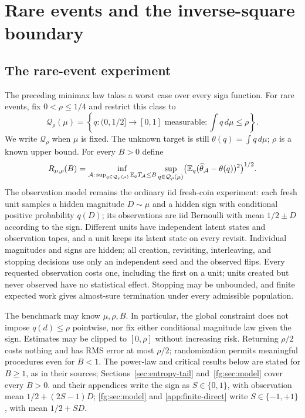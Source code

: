 \section{Rare events and the inverse-square boundary}\label{sec:rare}
\subsection{The rare-event experiment}\label{sec:rare-model}
The preceding minimax law takes a worst case over every sign function.
For rare events, fix $0<\rho\le1/4$ and restrict this class to
\[
 \mathcal Q_\rho(\mu)=
 \left\{q:(0,1/2]\to[0,1]\text{ measurable}:\int q\,d\mu\le\rho\right\}.
\]
We write $\mathcal Q_\rho$ when $\mu$ is fixed.
The unknown target is still $\theta(q)=\int q\,d\mu$; $\rho$ is a known
upper bound. For every $B>0$ define
\[
 R_{\mu,\rho}(B)=
 \inf_{\mathcal A:\,\sup_{q\in\mathcal Q_\rho(\mu)}\mathbb E_qT_\mathcal A\le B}
 \sup_{q\in\mathcal Q_\rho(\mu)}
       \bigl(\mathbb E_q(\widehat\theta_\mathcal A-\theta(q))^2\bigr)^{1/2}.
\]
The observation model remains the ordinary iid fresh-coin experiment:
each fresh unit samples a hidden magnitude $D\sim\mu$ and a hidden sign
with conditional positive probability $q(D)$; its observations are iid
Bernoulli with mean $1/2\pm D$ according to the sign. Different units
have independent latent states and observation tapes, and a unit keeps
its latent state on every revisit. Individual magnitudes and signs are
hidden; all creation, revisiting, interleaving, and stopping decisions
use only an independent seed and the observed flips. Every requested
observation costs one, including the first on a unit; units created but
never observed have no statistical effect. Stopping may be unbounded,
and finite expected work gives almost-sure termination under every
admissible population.

The benchmark may know $\mu,\rho,B$. In particular, the global constraint
does not impose $q(d)\le\rho$ pointwise, nor fix either conditional
magnitude law given the sign. Estimates may be clipped to $[0,\rho]$
without increasing risk. Returning $\rho/2$ costs nothing and has
RMS error at most $\rho/2$; randomization permits meaningful procedures
even for $B<1$. The power-law and critical results below are stated for
$B\ge1$, as in their sources; Sections~\ref{sec:entropy-tail}
and~\ref{fg:sec:model} cover every $B>0$.
 and their appendices write the
sign as $S\in\{0,1\}$, with observation mean $1/2+(2S-1)D$;
\cref{fg:sec:model} and \cref{app:finite-direct} write $S\in\{-1,+1\}$,
with mean $1/2+SD$.

